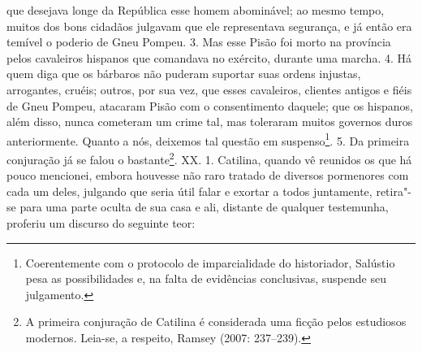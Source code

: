 que desejava longe da República esse homem abominável; ao mesmo tempo, muitos
dos bons cidadãos julgavam que ele representava segurança, e já então era
temível o poderio de Gneu Pompeu. 3. Mas esse Pisão foi morto na província
pelos cavaleiros hispanos que comandava no exército, durante uma marcha. 4. Há
quem diga que os bárbaros não puderam suportar suas ordens injustas,
arrogantes, cruéis; outros, por sua vez, que esses cavaleiros, clientes antigos
e fiéis de Gneu Pompeu, atacaram Pisão com o consentimento daquele; que os
hispanos, além disso, nunca cometeram um crime tal, mas toleraram muitos
governos duros anteriormente. Quanto a nós, deixemos tal questão em
suspenso\footnote{Coerentemente com o protocolo de imparcialidade do
historiador, Salústio pesa as possibilidades e, na falta de evidências
conclusivas, suspende seu julgamento.}. 5. Da primeira conjuração já se falou o
bastante\footnote{A primeira
conjuração de Catilina é considerada uma ficção pelos estudiosos modernos. Leia-se, a respeito, Ramsey (2007: 
237--239).}.  XX. 1. Catilina, quando vê reunidos os que há pouco mencionei,
embora houvesse não raro tratado de diversos pormenores com cada um deles,
julgando que seria útil falar e exortar a todos juntamente, retira"-se para uma
parte oculta de sua casa e ali, distante de qualquer testemunha, proferiu um
discurso do seguinte teor:

